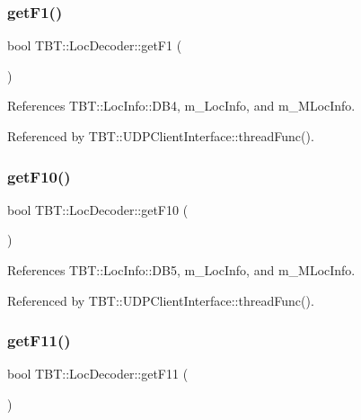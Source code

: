 \subsubsection{\texorpdfstring{get\+F1()}{getF1()}}
{\footnotesize\ttfamily bool T\+B\+T\+::\+Loc\+Decoder\+::get\+F1 (\begin{DoxyParamCaption}{ }\end{DoxyParamCaption})\hspace{0.3cm}{\ttfamily [inline]}}



References T\+B\+T\+::\+Loc\+Info\+::\+D\+B4, m\+\_\+\+Loc\+Info, and m\+\_\+\+M\+Loc\+Info.



Referenced by T\+B\+T\+::\+U\+D\+P\+Client\+Interface\+::thread\+Func().

\mbox{\label{classTBT_1_1LocDecoder_ac891adfab9ecf9ca3dec29d387698c30_ac891adfab9ecf9ca3dec29d387698c30}} 
\subsubsection{\texorpdfstring{get\+F10()}{getF10()}}
{\footnotesize\ttfamily bool T\+B\+T\+::\+Loc\+Decoder\+::get\+F10 (\begin{DoxyParamCaption}{ }\end{DoxyParamCaption})\hspace{0.3cm}{\ttfamily [inline]}}



References T\+B\+T\+::\+Loc\+Info\+::\+D\+B5, m\+\_\+\+Loc\+Info, and m\+\_\+\+M\+Loc\+Info.



Referenced by T\+B\+T\+::\+U\+D\+P\+Client\+Interface\+::thread\+Func().

\mbox{\label{classTBT_1_1LocDecoder_af3beee6516b8af8046b469d6326250b1_af3beee6516b8af8046b469d6326250b1}} 
\subsubsection{\texorpdfstring{get\+F11()}{getF11()}}
{\footnotesize\ttfamily bool T\+B\+T\+::\+Loc\+Decoder\+::get\+F11 (\begin{DoxyParamCaption}{ }\end{DoxyParamCaption})\hspace{0.3cm}{\ttfamily [inline]}}



